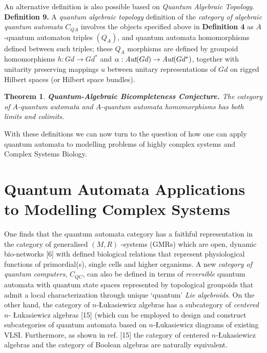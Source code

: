 \documentclass[12pt]{article}
\theoremstyle{plain}
\newtheorem{theorem}{Theorem}[section]
\theoremstyle{definition}
\numberwithin{equation}{section}
\begin{document}
\bigbreak
An alternative definition is also possible based on {\em Quantum Algebraic Topology}.
\bigbreak
\textbf{Definition 9.}  A \emph{quantum algebraic topology} definition of the {\em category of algebraic quantum automata} $C_{QA}$  involves the objects specified above in \textbf{Definition 4} as $A$-quantum automaton triples $(Q_A)$, and quantum automata homomorphisms defined between such triples; these $Q_A$ morphisms are defined by groupoid homomorphisms $h: Gd \rightarrow Gd ^*$ and $\alpha: \emph{Aut}(Gd) \rightarrow  \emph{Aut}(Gd ^*)$, together with unitarity preserving mappings $u$ between unitary representations of $Gd$ on rigged Hilbert spaces (or Hilbert space bundles).

\begin{theorem} {\rm{\textbf{Quantum-Algebraic Bicompleteness Conjecture.} }}  
\emph{The category of $A$-quantum automata and $A$-quantum automata homomorphisms has both limits and colimits.}
\end{theorem}

With these definitions we can now turn to the question of how one can apply quantum automata to modelling problems of highly complex systems and Complex Systems Biology.


\section{Quantum Automata Applications to Modelling Complex Systems}

One finds that the quantum automata category has a faithful representation in the category of generalised  $(M,R)$ -systems (GMRs) which are open, dynamic bio-networks [6] with defined biological relations that represent physiological functions of primordial(s), single cells and higher organisms. A new \emph{category of quantum computers}, $C_{QC}$, can also be defined in terms of \emph{reversible} quantum automata with quantum state spaces represented by topological groupoids that admit a local characterization through unique `quantum' \emph{Lie algebroids}. On the other hand, the category of $n$-\L ukasiewicz algebras has a subcategory of \emph{centered} $n$- \L{}ukasiewicz algebras [15] (which can be employed to design and construct subcategories of quantum automata based on $n$-{}\L ukasiewicz diagrams of existing VLSI. Furthermore, as shown in ref. [15] the category of centered $n$-{}\L ukasiewicz algebras and the category of Boolean algebras are naturally equivalent.
\end{document}
